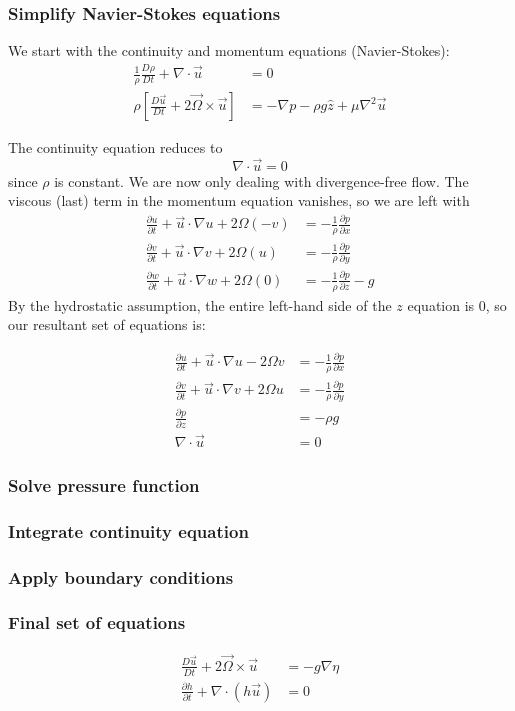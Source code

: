 \documentclass[12pt, twoside, letterpaper]{article}
\begin{document}
\subsubsection{Simplify Navier-Stokes equations}
We start with the continuity and momentum equations (Navier-Stokes):
\begin{align}
\frac{1}{\rho} \frac{D \rho}{Dt} + \nabla \cdot \vec u &= 0 \\
\rho \left[ \frac{D \vec u}{Dt} + 2\vec \Omega \times \vec u \right] &= -\nabla p - \rho g \hat z + \mu \nabla^2 \vec u
\end{align}

The continuity equation reduces to
$$
\nabla \cdot \vec u = 0
$$
since $\rho$ is constant. We are now only dealing with divergence-free flow. The viscous (last) term in the momentum equation vanishes, so we are left with
\begin{align*}
\frac{\partial u}{\partial t} + \vec u \cdot \nabla u + 2\Omega (-v) &= -\frac{1}{\rho} \frac{\partial p}{\partial x} \\
\frac{\partial v}{\partial t} + \vec u \cdot \nabla v+ 2\Omega (u) &= -\frac{1}{\rho} \frac{\partial p}{\partial y} \\
\frac{\partial w}{\partial t} + \vec u \cdot \nabla w + 2\Omega (0) &= -\frac{1}{\rho} \frac{\partial p}{\partial z} - g
\end{align*}
By the hydrostatic assumption, the entire left-hand side of the $z$ equation is 0, so our resultant set of equations is:

\begin{align*}
\frac{\partial u}{\partial t} + \vec u \cdot \nabla u - 2\Omega v &= -\frac{1}{\rho} \frac{\partial p}{\partial x} \\
\frac{\partial v}{\partial t} + \vec u \cdot \nabla v+ 2\Omega u &= -\frac{1}{\rho} \frac{\partial p}{\partial y} \\
\frac{\partial p}{\partial z} &= -\rho g \\
\nabla \cdot \vec u &= 0
\end{align*}

\subsubsection{Solve pressure function}
\subsubsection{Integrate continuity equation}
\subsubsection{Apply boundary conditions}
\subsubsection{Final set of equations}
\begin{align}
\frac{D \vec u}{Dt} + 2 \vec \Omega \times \vec u &= -g \nabla \eta \\
\frac{\partial h}{\partial t} + \nabla \cdot (h \vec u) &= 0
\end{align}
\end{document}
